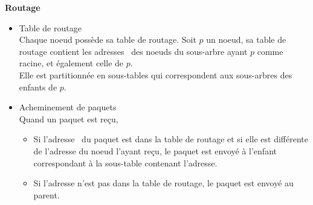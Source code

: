         \textbf{Routage}\newline
        \begin{itemize}
            \item Table de routage\\
                Chaque noeud possède sa table de routage. Soit $p$ un noeud, sa table de routage contient les adresses \mac\ 
                des noeuds du sous-arbre ayant $p$ comme racine, et également celle de $p$.\\
                Elle est partitionnée en sous-tables qui correspondent aux sous-arbres des enfants de $p$.
            \item Acheminement de paquets\\
                Quand un paquet est reçu,
                \begin{itemize}
                    \item Si l'adresse \mac\ du paquet est dans la table de routage et si elle est différente de l'adresse du noeud l'ayant reçu, le paquet est envoyé
                    à l'enfant correspondant à la sous-table contenant l'adresse.
                    \item Si l'adresse n'est pas dans la table de routage, le paquet est envoyé au parent.
                \end{itemize}

        \end{itemize}
        \vspace{0.5cm}


